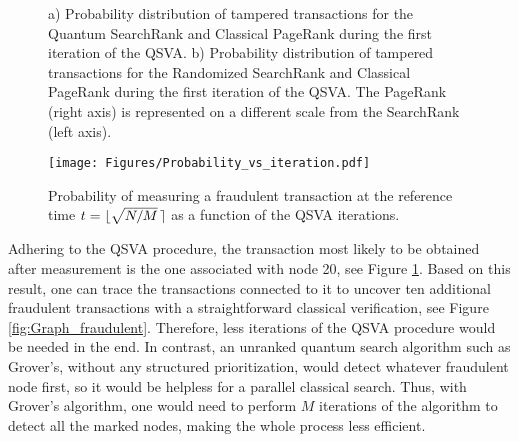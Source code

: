 \documentclass[nofootinbib,aps,prd,reprint,superscriptaddress,floatfix]{revtex4-2}
\begin{document}
\begin{figure}[hbtp]
	\centering
	\label{fig:QS_i_1}
	\label{fig:QS_i_1}
        \caption {a) Probability distribution of tampered transactions for the Quantum SearchRank and Classical PageRank during the first iteration of the QSVA.
                b) Probability distribution of tampered transactions for the Randomized SearchRank and Classical PageRank during the first iteration of the QSVA. The PageRank (right axis) is represented on a different scale from the SearchRank (left axis).}
	\label{fig:First_iteration}
\end{figure}

\setcounter{figure}{8}

\begin{figure}[hbtp]
    \centering
    \texttt{[image: Figures/Probability\_vs\_iteration.pdf]}
    \caption{Probability of measuring a fraudulent transaction at the reference time $t=\lfloor\sqrt{N/M} \hspace{1.5pt}\rceil$ as a function of the QSVA iterations.}
    \label{fig:probability_vs_iteration}
\end{figure}

Adhering to the QSVA procedure, the transaction most likely to be obtained after measurement is the one associated with node 20, see Figure \ref{fig:First_iteration}. Based on this result, one can trace the transactions connected to it to uncover ten additional fraudulent transactions with a straightforward classical verification, see Figure \ref{fig:Graph_fraudulent}. Therefore, less iterations of the QSVA procedure would be needed in the end. In contrast, an unranked quantum search algorithm such as Grover's, without any structured prioritization, would detect whatever fraudulent node first, so it would be helpless for a parallel classical search. Thus, with Grover's algorithm, one would need to perform $M$ iterations of the algorithm to detect all the marked nodes, making the whole process less efficient.
\end{document}

